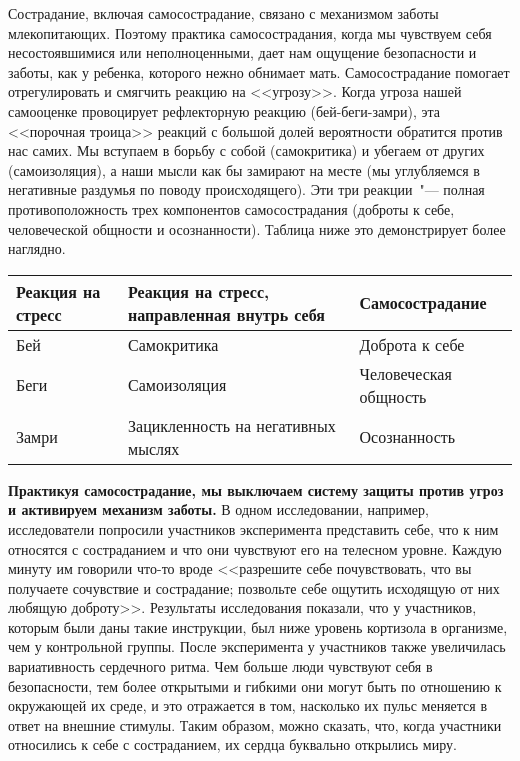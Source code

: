 Сострадание, включая самосострадание, связано с механизмом заботы млекопитающих. Поэтому практика самосострадания, когда мы чувствуем себя несостоявшимися или неполноценными, дает нам ощущение безопасности и заботы, как у ребенка, которого нежно обнимает мать. Самосострадание помогает отрегулировать и смягчить реакцию на <<угрозу>>. Когда угроза нашей самооценке провоцирует рефлекторную реакцию (бей-беги-замри), эта <<порочная троица>> реакций с большой долей вероятности обратится против нас самих. Мы вступаем в борьбу с собой (самокритика) и убегаем от других (самоизоляция), а наши мысли как бы замирают на месте (мы углубляемся в негативные раздумья по поводу происходящего). Эти три реакции~"--- полная противоположность трех компонентов самосострадания (доброты к себе, человеческой общности и осознанности). Таблица ниже это демонстрирует более наглядно.

\begin{center}
	\setlength{\extrarowheight}{2mm}
	\begin{tabularx}{\textwidth}{p{2cm}p{7cm}X}
		\textbf{Реакция на стресс} & \textbf{Реакция на стресс, направленная внутрь себя} & \textbf{Самосострадание} \\
		\hline \hline 
		Бей	& Самокритика & Доброта к себе \\
		Беги & Самоизоляция	& Человеческая общность \\
		Замри & Зацикленность на негативных мыслях & Осознанность \\
	\end{tabularx}
	\setlength{\extrarowheight}{0mm}
\end{center}

\textbf{Практикуя самосострадание, мы выключаем систему защиты против угроз и активируем механизм заботы.} В одном исследовании, например, исследователи попросили участников эксперимента представить себе, что к ним относятся с состраданием и что они чувствуют его на телесном уровне. Каждую минуту им говорили что-то вроде <<разрешите себе почувствовать, что вы получаете сочувствие и сострадание; позвольте себе ощутить исходящую от них любящую доброту>>. Результаты исследования показали, что у участников, которым были даны такие инструкции, был ниже уровень кортизола в организме, чем у контрольной группы. После эксперимента у участников также увеличилась вариативность сердечного ритма. Чем больше люди чувствуют себя в безопасности, тем более открытыми и гибкими они могут быть по отношению к окружающей их среде, и это отражается в том, насколько их пульс меняется в ответ на внешние стимулы. Таким образом, можно сказать, что, когда участники относились к себе с состраданием, их сердца буквально открылись миру.


